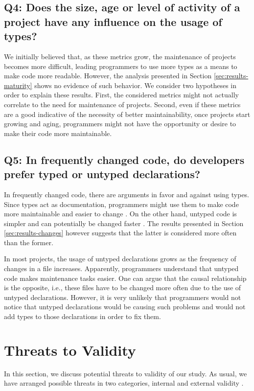 \documentclass[]{sigplanconf}
\begin{document}
\subsection*{Q4: Does the size, age or level of activity  of a project have any influence on the usage of types?\label{discussion-q4}}
We initially believed that, as these metrics grow, the maintenance of projects becomes more difficult, leading programmers to use more types as a means to make code more readable.
However, the analysis presented in Section \ref{sec:results-maturity} shows no evidence of such behavior.
We consider two hypotheses in order to explain these results.
First, the considered metrics might not actually correlate to the need for maintenance of projects.
Second, even if these metrics are a good indicative of the necessity of better maintainability, once projects start growing and aging, programmers might not have the opportunity or desire to make their code more maintainable.

\subsection*{Q5: In frequently changed code, do developers prefer typed or untyped declarations?\label{discussion-q5}}
In frequently changed code, there are arguments in favor and against using types.
Since types act as documentation, programmers might use them to make code more maintainable and easier to change  \cite{should_your_specification_language_be_typed}.
On the other hand, untyped code is simpler and can potentially be changed faster \cite{gradual_typing}.
The results presented in Section \ref{sec:results-changes} however suggests that the latter is considered more often than the former.

In most projects, the usage of untyped declarations grows as the frequency of changes in a file increases.
Apparently, programmers understand that untyped code makes maintenance tasks easier.
One can argue that the causal relationship is the opposite, i.e., these files have to be changed more often due to the use of untyped declarations.
However, it is very unlikely that programmers would not notice that untyped declarations would be causing such problems and would not add types to those declarations in order to fix them.










%
%
\section{Threats to Validity\label{threats}}
In this section, we discuss potential threats to validity of our study. As usual, we have arranged possible threats in two categories, internal and external validity \cite{Wohlin2012}. 
\end{document}
